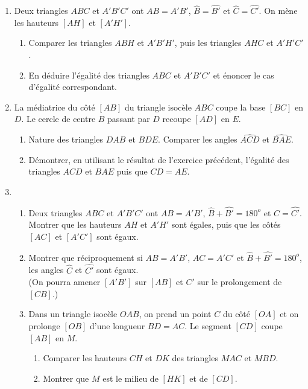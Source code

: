 \begin{enumerate}
\begin{enumerate}
\end{enumerate}
\item Deux triangles $ABC$ et $A'B'C'$ ont $AB=A'B'$, $\widehat{B}=\widehat{B'}$ et $\widehat{C}=\widehat{C'}$. On mène les hauteurs $[AH]$ et $[A'H']$. \begin{enumerate}
\item Comparer les triangles $ABH$ et $A'B'H'$, puis les triangles $AHC$ et $A'H'C'$.
\item En déduire l'égalité des triangles $ABC$ et $A'B'C'$ et énoncer le cas 
d'égalité correspondant.
\end{enumerate}
\item La médiatrice du côté $[AB]$ du triangle isocèle $ABC$ coupe la base $[BC]$ en $D$. Le cercle de centre $B$ passant par $D$ recoupe $[AD]$ en $E$. \begin{enumerate}
\item Nature des triangles $DAB$ et $BDE$. Comparer les angles $\widehat{ACD}$ et 
$\widehat{BAE}$. 
\item Démontrer, en utilisant le résultat de l'exercice précédent, l'égalité
des triangles $ACD$ et $BAE$ puis que $CD=AE$.
\end{enumerate}
\item \begin{enumerate}
\item Deux triangles $ABC$ et $A'B'C'$ ont $AB=A'B'$, $\widehat{B}+\widehat{B'}=180^o$ et $\widehat{C}= \widehat{C'}$. Montrer que les hauteurs $AH$ et $A'H'$ sont égales, puis que les côtés $[AC]$ et $[A'C']$ sont égaux.
\item Montrer que réciproquement si $AB=A'B'$, $AC=A'C'$ et $\widehat{B}+\widehat{B'}=180^o$, les angles $\widehat{C}$ et $\widehat{C'}$ sont égaux. \\ (On pourra amener $[A'B']$ sur $[AB]$ et $C'$ sur le prolongement de $[CB]$.)
\item Dans un triangle isocèle $OAB$, on prend un point $C$ du côté $[OA]$ et on
prolonge $[OB]$ d'une longueur $BD=AC$. Le segment $[CD]$ coupe $[AB]$ en $M$. 
\begin{enumerate}
\item Comparer les hauteurs $CH$ et $DK$ des triangles $MAC$ et $MBD$. 
\item Montrer que $M$ est le milieu de $[HK]$ et de $[CD]$.
\end{enumerate}
\end{enumerate}
\end{enumerate}